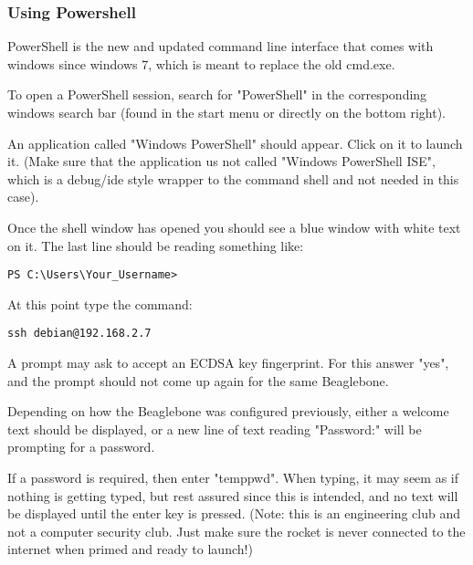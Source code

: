 \documentclass[12pt,article]{memoir}
\begin{document}
\subsubsection{Using Powershell}
PowerShell is the new and updated command line interface that comes with windows since windows 7, which is meant to replace the old cmd.exe.\par
To open a PowerShell session, search for "PowerShell" in the corresponding windows search bar (found in the start menu or directly on the bottom right).\par
An application called "Windows PowerShell" should appear. Click on it to launch it. (Make sure that the application us not called "Windows PowerShell ISE", which is a debug/ide style wrapper to the command shell and not needed in this case).\par
Once the shell window has opened you should see a blue window with white text on it. The last line should be reading something like:
\begin{lstlisting}
PS C:\Users\Your_Username>
\end{lstlisting}

At this point type the command:
\begin{lstlisting}
ssh debian@192.168.2.7
\end{lstlisting}

A prompt may ask to accept an ECDSA key fingerprint. For this answer "yes", and the prompt should not come up again for the same Beaglebone.\par
Depending on how the Beaglebone was configured previously, either a welcome text should be displayed, or a new line of text reading "Password:" will be prompting for a password.\par
If a password is required, then enter "temppwd". When typing, it may seem as if nothing is getting typed, but rest assured since this is intended, and no text will be displayed until the enter key is pressed. (Note: this is an engineering club and not a computer security club. Just make sure the rocket is never connected to the internet when primed and ready to launch!)
\end{document}
